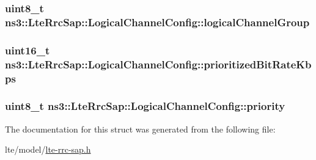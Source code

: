 \subsubsection[{\texorpdfstring{logical\+Channel\+Group}{logicalChannelGroup}}]{\setlength{\rightskip}{0pt plus 5cm}uint8\+\_\+t ns3\+::\+Lte\+Rrc\+Sap\+::\+Logical\+Channel\+Config\+::logical\+Channel\+Group}\hypertarget{structns3_1_1LteRrcSap_1_1LogicalChannelConfig_ae60ea4e76caeaf8d45098f06498463c4}{}\label{structns3_1_1LteRrcSap_1_1LogicalChannelConfig_ae60ea4e76caeaf8d45098f06498463c4}
\subsubsection[{\texorpdfstring{prioritized\+Bit\+Rate\+Kbps}{prioritizedBitRateKbps}}]{\setlength{\rightskip}{0pt plus 5cm}uint16\+\_\+t ns3\+::\+Lte\+Rrc\+Sap\+::\+Logical\+Channel\+Config\+::prioritized\+Bit\+Rate\+Kbps}\hypertarget{structns3_1_1LteRrcSap_1_1LogicalChannelConfig_ac1a5aeec29094b3f40dae4dc949b4dab}{}\label{structns3_1_1LteRrcSap_1_1LogicalChannelConfig_ac1a5aeec29094b3f40dae4dc949b4dab}
\subsubsection[{\texorpdfstring{priority}{priority}}]{\setlength{\rightskip}{0pt plus 5cm}uint8\+\_\+t ns3\+::\+Lte\+Rrc\+Sap\+::\+Logical\+Channel\+Config\+::priority}\hypertarget{structns3_1_1LteRrcSap_1_1LogicalChannelConfig_a8db687be39b6631fc05232b6264422f3}{}\label{structns3_1_1LteRrcSap_1_1LogicalChannelConfig_a8db687be39b6631fc05232b6264422f3}


The documentation for this struct was generated from the following file\+:\begin{DoxyCompactItemize}
\item 
lte/model/\hyperlink{lte-rrc-sap_8h}{lte-\/rrc-\/sap.\+h}\end{DoxyCompactItemize}
